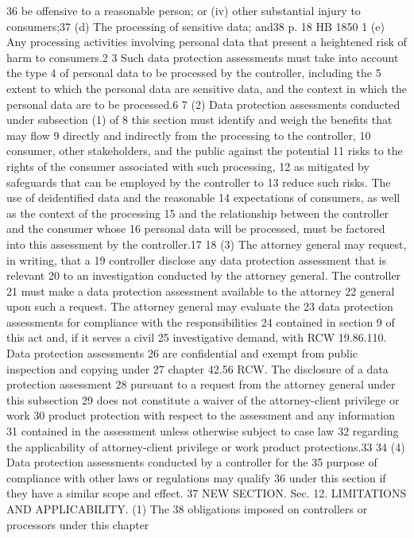 36 be offensive to a reasonable person; or (iv) other substantial injury
to consumers;37
(d) The processing of sensitive data; and38
p. 18 HB 1850
1 (e) Any processing activities involving personal data that
present a heightened risk of harm to consumers.2
3 Such data protection assessments must take into account the type
4 of personal data to be processed by the controller, including the
5 extent to which the personal data are sensitive data, and the context
in which the personal data are to be processed.6
7 (2) Data protection assessments conducted under subsection (1) of
8 this section must identify and weigh the benefits that may flow
9 directly and indirectly from the processing to the controller,
10 consumer, other stakeholders, and the public against the potential
11 risks to the rights of the consumer associated with such processing,
12 as mitigated by safeguards that can be employed by the controller to
13 reduce such risks. The use of deidentified data and the reasonable
14 expectations of consumers, as well as the context of the processing
15 and the relationship between the controller and the consumer whose
16 personal data will be processed, must be factored into this
assessment by the controller.17
18 (3) The attorney general may request, in writing, that a
19 controller disclose any data protection assessment that is relevant
20 to an investigation conducted by the attorney general. The controller
21 must make a data protection assessment available to the attorney
22 general upon such a request. The attorney general may evaluate the
23 data protection assessments for compliance with the responsibilities
24 contained in section 9 of this act and, if it serves a civil
25 investigative demand, with RCW 19.86.110. Data protection assessments
26 are confidential and exempt from public inspection and copying under
27 chapter 42.56 RCW. The disclosure of a data protection assessment
28 pursuant to a request from the attorney general under this subsection
29 does not constitute a waiver of the attorney-client privilege or work
30 product protection with respect to the assessment and any information
31 contained in the assessment unless otherwise subject to case law
32 regarding the applicability of attorney-client privilege or work
product protections.33
34 (4) Data protection assessments conducted by a controller for the
35 purpose of compliance with other laws or regulations may qualify
36 under this section if they have a similar scope and effect.
37 NEW SECTION. Sec. 12. LIMITATIONS AND APPLICABILITY. (1) The
38 obligations imposed on controllers or processors under this chapter
